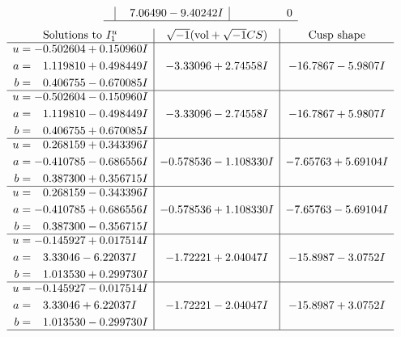 \documentclass[1p]{elsarticle_modified}
\theoremstyle{definition}
\newcommand{\I}{\sqrt{-1}}
\begin{document}
$$\begin{array}{c|c|c}
 & \phantom{-}7.06490 - 9.40242 I & \phantom{-0.000000 } 0\\
 \hline 
 \end{array}$$\newpage$$\begin{array}{c|c|c}  
\text{Solutions to }I^u_{1}& \I (\text{vol} + \sqrt{-1}CS) & \text{Cusp shape}\\
 \hline 
\begin{aligned}
u &= -0.502604 + 0.150960 I \\
a &= \phantom{-}1.119810 + 0.498449 I \\
b &= \phantom{-}0.406755 - 0.670085 I\end{aligned}
 & -3.33096 + 2.74558 I & -16.7867 - 5.9807 I \\ \hline\begin{aligned}
u &= -0.502604 - 0.150960 I \\
a &= \phantom{-}1.119810 - 0.498449 I \\
b &= \phantom{-}0.406755 + 0.670085 I\end{aligned}
 & -3.33096 - 2.74558 I & -16.7867 + 5.9807 I \\ \hline\begin{aligned}
u &= \phantom{-}0.268159 + 0.343396 I \\
a &= -0.410785 - 0.686556 I \\
b &= \phantom{-}0.387300 + 0.356715 I\end{aligned}
 & -0.578536 - 1.108330 I & -7.65763 + 5.69104 I \\ \hline\begin{aligned}
u &= \phantom{-}0.268159 - 0.343396 I \\
a &= -0.410785 + 0.686556 I \\
b &= \phantom{-}0.387300 - 0.356715 I\end{aligned}
 & -0.578536 + 1.108330 I & -7.65763 - 5.69104 I \\ \hline\begin{aligned}
u &= -0.145927 + 0.017514 I \\
a &= \phantom{-}3.33046 - 6.22037 I \\
b &= \phantom{-}1.013530 + 0.299730 I\end{aligned}
 & -1.72221 + 2.04047 I & -15.8987 - 3.0752 I \\ \hline\begin{aligned}
u &= -0.145927 - 0.017514 I \\
a &= \phantom{-}3.33046 + 6.22037 I \\
b &= \phantom{-}1.013530 - 0.299730 I\end{aligned}
 & -1.72221 - 2.04047 I & -15.8987 + 3.0752 I\\
 \hline 
 \end{array}$$\newpage\newpage\renewcommand{\arraystretch}{1}
\end{document}
